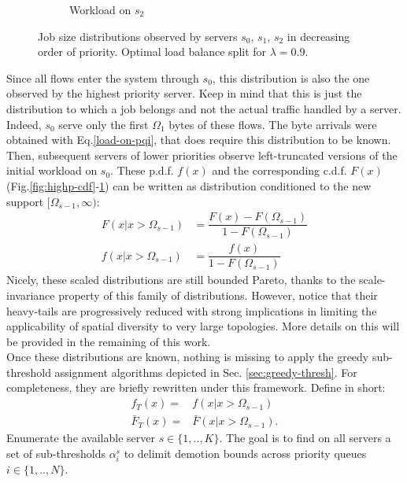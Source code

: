 \begin{figure}
\begin{subfigure}{.3\textwidth}
	\caption{Workload on $s_2$}
	\label{fig:lowp-cdf}
	\end{subfigure}
	\caption{Job size distributions observed by servers $s_0$, $s_1$, $s_2$ in decreasing order of priority. Optimal load balance split for $\lambda=0.9$.}
	\label{fig:sd-spine-distribution}
\end{figure}
Since all flows enter the system through $s_0$, this distribution is also the one observed by the highest priority server. Keep in mind that this is just the distribution to which a job belongs and not the actual traffic handled by a server. Indeed, $s_0$ serve only the first $\Omega_1$ bytes of these flows. The byte arrivals were obtained with Eq.\eqref{load-on-pqi}, that does require this distribution to be known. Then, subsequent servers of lower priorities observe left-truncated versions of the initial workload on $s_0$. These p.d.f. $f(x)$ and the corresponding c.d.f. $F(x)$ (Fig.\ref{fig:highp-cdf}-\ref{fig:lowp-cdf}) can be written as distribution conditioned to the new support $[\Omega_{s-1},\infty)$:
\begin{equation}
\label{eq:conditionalpdf}
\begin{aligned}
F(x|x>\Omega_{s-1}) &= \dfrac{F(x) - F(\Omega_{s-1})}{1-F(\Omega_{s-1})}  \\
f(x|x>\Omega_{s-1}) &= \dfrac{f(x)}{1-F(\Omega_{s-1})} 
\end{aligned}
\end{equation}
Nicely, these scaled distributions are still bounded Pareto, thanks to the scale-invariance property of this family of distributions. However, notice that their heavy-tails are progressively reduced with strong implications in limiting the applicability of spatial diversity to very large topologies. More details on this will be provided in the remaining of this work. \\
Once these distributions are known, nothing is missing to apply the greedy sub-threshold assignment algorithms depicted in Sec. \ref{sec:greedy-thresh}. For completeness, they are briefly rewritten under this framework. Define in short:
\begin{align*}
	f_T(x) =& f(x|x>\Omega_{s-1})\\
	\bar{F}_T(x) =& \bar{F}(x|x>\Omega_{s-1}). 
\end{align*}
Enumerate the available server $s \in \{1,..,K\}$. The goal is to find on all servers a set of sub-thresholds $\alpha_i^s$ to delimit demotion bounds across priority queues $i \in \{1,..,N\}$. \\
